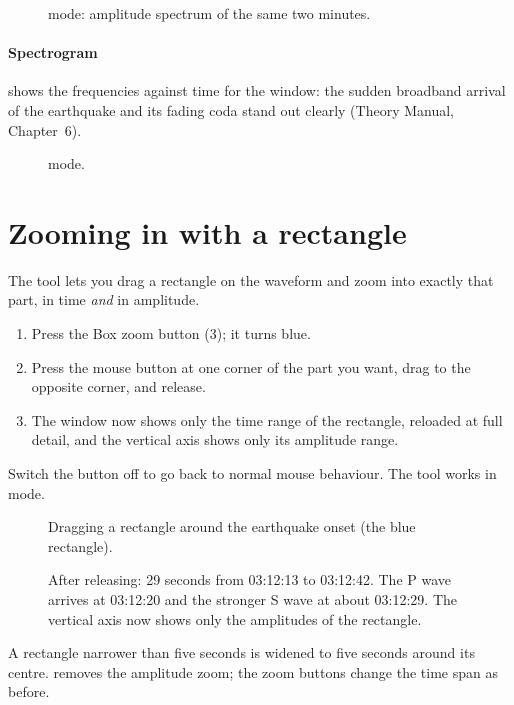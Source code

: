 \begin{figure}[tbp]
\centering
{}
\caption{ mode: amplitude spectrum of the same two minutes.}
\end{figure}

\paragraph{Spectrogram} shows the frequencies against time for the window: the sudden broadband arrival of the earthquake and its
fading coda stand out clearly (Theory Manual, Chapter~6).

\begin{figure}[tbp]
\centering
{}
\caption{ mode.}
\end{figure}

\section{Zooming in with a rectangle}
The  tool lets you drag a rectangle on the waveform and zoom into exactly that part, in time \emph{and} in amplitude.
\begin{enumerate}
\item Press the Box zoom button (3); it turns blue.
\item Press the mouse button at one corner of the part you want, drag to the opposite corner, and release.
\item The window now shows only the time range of the rectangle, reloaded at full detail, and the vertical axis shows only its amplitude range.
\end{enumerate}
Switch the button off to go back to normal mouse behaviour. The tool works in  mode.

\begin{figure}[tbp]
\centering
{}
\caption{Dragging a rectangle around the earthquake onset (the blue rectangle).}
\end{figure}

\begin{figure}[tbp]
\centering
{}
\caption{After releasing: 29 seconds from 03:12:13 to 03:12:42. The P wave arrives at 03:12:20 and the stronger S wave at about
03:12:29. The vertical axis now shows only the amplitudes of the rectangle.}
\end{figure}

A rectangle narrower than five seconds is widened to five seconds around its centre.  removes the amplitude zoom;
the zoom buttons change the time span as before.

